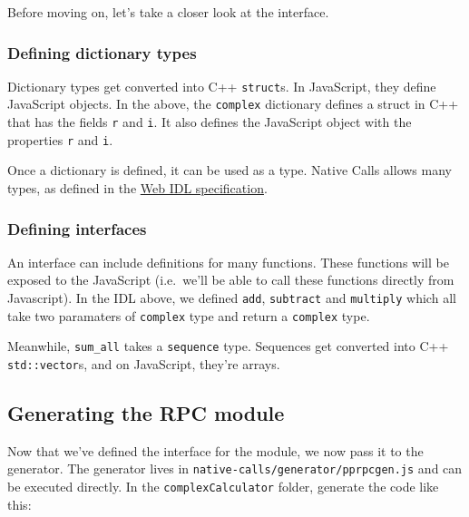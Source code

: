 Before moving on, let's take a closer look at the interface.

\subsubsection{Defining dictionary
types}\label{defining-dictionary-types}

Dictionary types get converted into C++ \texttt{struct}s. In JavaScript,
they define JavaScript objects. In the above, the \texttt{complex}
dictionary defines a struct in C++ that has the fields \texttt{r} and
\texttt{i}. It also defines the JavaScript object with the properties
\texttt{r} and \texttt{i}.

Once a dictionary is defined, it can be used as a type. Native Calls
allows many types, as defined in the
\href{http://www.w3.org/TR/WebIDL/}{Web IDL specification}.

\subsubsection{Defining interfaces}\label{defining-interfaces}

An interface can include definitions for many functions. These functions
will be exposed to the JavaScript (i.e.~we'll be able to call these
functions directly from Javascript). In the IDL above, we defined
\texttt{add}, \texttt{subtract} and \texttt{multiply} which all take two
paramaters of \texttt{complex} type and return a \texttt{complex} type.

Meanwhile, \texttt{sum\_all} takes a \texttt{sequence} type. Sequences
get converted into C++ \texttt{std::vector}s, and on JavaScript, they're
arrays.

\subsection{Generating the RPC module}\label{generating-the-rpc-module}

Now that we've defined the interface for the module, we now pass it to
the generator. The generator lives in
\texttt{native-calls/generator/pprpcgen.js} and can be executed
directly. In the \texttt{complexCalculator} folder, generate the code
like this:

\begin{Shaded}
\begin{Highlighting}[]
 
\end{Highlighting}
\end{Shaded}

